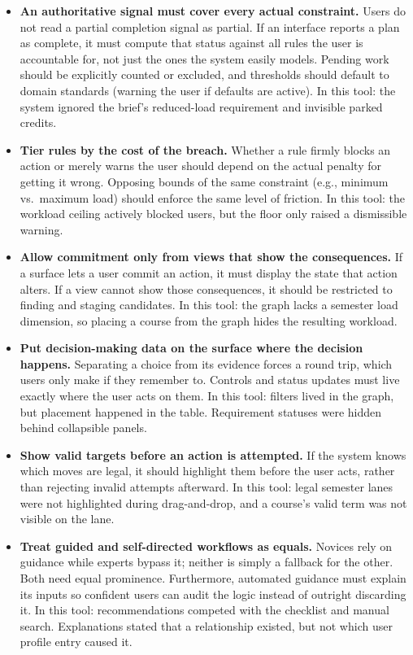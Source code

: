 \begin{itemize}
  \item \textbf{An authoritative signal must cover every actual constraint.} Users do not read a partial completion signal as partial. If an interface reports a plan as complete, it must compute that status against all rules the user is accountable for, not just the ones the system easily models. Pending work should be explicitly counted or excluded, and thresholds should default to domain standards (warning the user if defaults are active). In this tool: the system ignored the brief's reduced-load requirement and invisible parked credits.
  
  \item \textbf{Tier rules by the cost of the breach.} Whether a rule firmly blocks an action or merely warns the user should depend on the actual penalty for getting it wrong. Opposing bounds of the same constraint (e.g., minimum vs.\ maximum load) should enforce the same level of friction. In this tool: the workload ceiling actively blocked users, but the floor only raised a dismissible warning.
  
  \item \textbf{Allow commitment only from views that show the consequences.} If a surface lets a user commit an action, it must display the state that action alters. If a view cannot show those consequences, it should be restricted to finding and staging candidates. In this tool: the graph lacks a semester load dimension, so placing a course from the graph hides the resulting workload.
  
  \item \textbf{Put decision-making data on the surface where the decision happens.} Separating a choice from its evidence forces a round trip, which users only make if they remember to. Controls and status updates must live exactly where the user acts on them. In this tool: filters lived in the graph, but placement happened in the table. Requirement statuses were hidden behind collapsible panels.
  
  \item \textbf{Show valid targets before an action is attempted.} If the system knows which moves are legal, it should highlight them before the user acts, rather than rejecting invalid attempts afterward. In this tool: legal semester lanes were not highlighted during drag-and-drop, and a course's valid term was not visible on the lane.
  
  \item \textbf{Treat guided and self-directed workflows as equals.} Novices rely on guidance while experts bypass it; neither is simply a fallback for the other. Both need equal prominence. Furthermore, automated guidance must explain its inputs so confident users can audit the logic instead of outright discarding it. In this tool: recommendations competed with the checklist and manual search. Explanations stated that a relationship existed, but not which user profile entry caused it.
\end{itemize}

